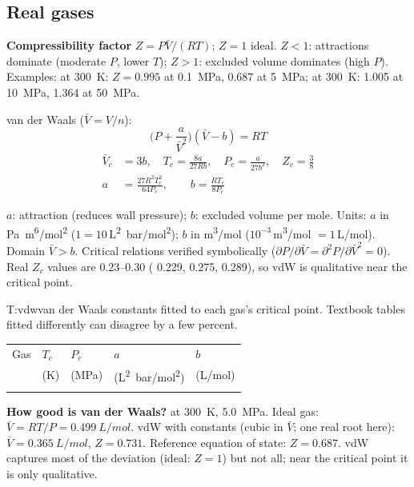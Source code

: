 \begin{multicols}{2}
\subsection{Real gases}\label{sec:realgas}
\CORE{} \textbf{Compressibility factor} $Z=P\bar V/(RT)$; $Z=1$ ideal. $Z<1$: attractions dominate (moderate $P$, lower $T$); $Z>1$: excluded volume dominates (high $P$). Examples:  at \SI{300}{K}: $Z=0.995$ at \SI{0.1}{MPa}, 0.687 at \SI{5}{MPa};  at \SI{300}{K}: 1.005 at \SI{10}{MPa}, 1.364 at \SI{50}{MPa}.
\begin{formulabox}van der Waals ($\bar V=V/n$):
\begin{equation}
\Big(P+\frac{a}{\bar V^2}\Big)(\bar V-b)=RT \label{F:gas:vdw}
\end{equation}
\vspace{-12pt}
\begin{align}
\bar V_c&=3b,\quad T_c=\frac{8a}{27Rb},\quad P_c=\frac{a}{27b^2},\quad Z_c=\tfrac38 \label{F:gas:vdwcrit}\\
a&=\frac{27R^2T_c^2}{64P_c},\qquad b=\frac{RT_c}{8P_c} \label{F:gas:vdwab}
\end{align}
\end{formulabox}
$a$: attraction (reduces wall pressure); $b$: excluded volume per mole. Units: $a$ in \si{Pa.m^6/mol^2} ($1=10$\,\si{L^2.bar/mol^2}); $b$ in \si{m^3/mol} ($10^{-3}$\,\si{m^3/mol} $=1$\,\si{L/mol}). Domain $\bar V>b$. Critical relations verified symbolically ($\partial P/\partial\bar V=\partial^2P/\partial\bar V^2=0$). Real $Z_c$ values are 0.23--0.30 ( 0.229,  0.275,  0.289), so vdW is qualitative near the critical point.

\begin{reftab}{T:vdw}{van der Waals constants fitted to each gas's critical point. Textbook tables fitted differently can disagree by a few percent.}
\small
\begin{tabularx}{\linewidth}{@{}lYYYY@{}}
\toprule
Gas & $T_c$ & $P_c$ & $a$ & $b$\\
 & (K) & (MPa) & (\si{L^2.bar/mol^2}) & (\si{L/mol})\\
\midrule
{}
\bottomrule
\end{tabularx}\end{reftab}

\begin{demobox}\textbf{How good is van der Waals?}  at \SI{300}{K}, \SI{5.0}{MPa}. Ideal gas: $\bar V=RT/P=\SI{0.499}{L/mol}$. vdW with  constants (cubic in $\bar V$; one real root here): $\bar V=\SI{0.365}{L/mol}$, $Z=0.731$. Reference equation of state: $Z=0.687$. vdW captures most of the deviation (ideal: $Z=1$) but not all; near the critical point it is only qualitative.\end{demobox}


\end{multicols}

